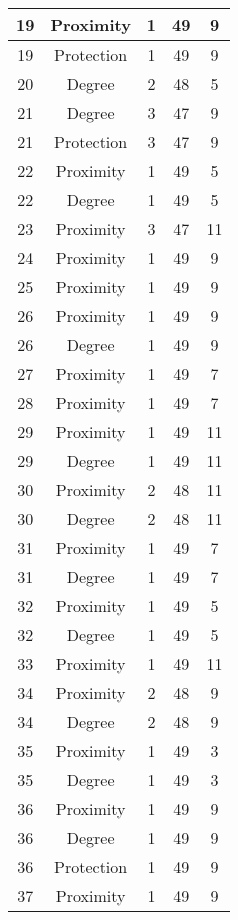 \documentclass[results.tex]{subfiles}
\begin{document}
\begin{center}
\begin{tabular}{| c || c | c | c | c |}
    \hline
    19 & Proximity & 1 & 49 & 9 \\ 
    \hline
    19 & Protection & 1 & 49 & 9 \\ 
    \hline
    20 & Degree & 2 & 48 & 5 \\ 
    \hline
    21 & Degree & 3 & 47 & 9 \\ 
    \hline
    21 & Protection & 3 & 47 & 9 \\ 
    \hline
    22 & Proximity & 1 & 49 & 5 \\ 
    \hline
    22 & Degree & 1 & 49 & 5 \\ 
    \hline
    23 & Proximity & 3 & 47 & 11 \\ 
    \hline
    24 & Proximity & 1 & 49 & 9 \\ 
    \hline
    25 & Proximity & 1 & 49 & 9 \\ 
    \hline
    26 & Proximity & 1 & 49 & 9 \\ 
    \hline
    26 & Degree & 1 & 49 & 9 \\ 
    \hline
    27 & Proximity & 1 & 49 & 7 \\ 
    \hline
    28 & Proximity & 1 & 49 & 7 \\ 
    \hline
    29 & Proximity & 1 & 49 & 11 \\ 
    \hline
    29 & Degree & 1 & 49 & 11 \\ 
    \hline
    30 & Proximity & 2 & 48 & 11 \\ 
    \hline
    30 & Degree & 2 & 48 & 11 \\ 
    \hline
    31 & Proximity & 1 & 49 & 7 \\ 
    \hline
    31 & Degree & 1 & 49 & 7 \\ 
    \hline
    32 & Proximity & 1 & 49 & 5 \\ 
    \hline
    32 & Degree & 1 & 49 & 5 \\ 
    \hline
    33 & Proximity & 1 & 49 & 11 \\ 
    \hline
    34 & Proximity & 2 & 48 & 9 \\ 
    \hline
    34 & Degree & 2 & 48 & 9 \\ 
    \hline
    35 & Proximity & 1 & 49 & 3 \\ 
    \hline
    35 & Degree & 1 & 49 & 3 \\ 
    \hline
    36 & Proximity & 1 & 49 & 9 \\ 
    \hline
    36 & Degree & 1 & 49 & 9 \\ 
    \hline
    36 & Protection & 1 & 49 & 9 \\ 
    \hline
    37 & Proximity & 1 & 49 & 9 \\ 

\end{tabular}
\end{center}
\end{document}
